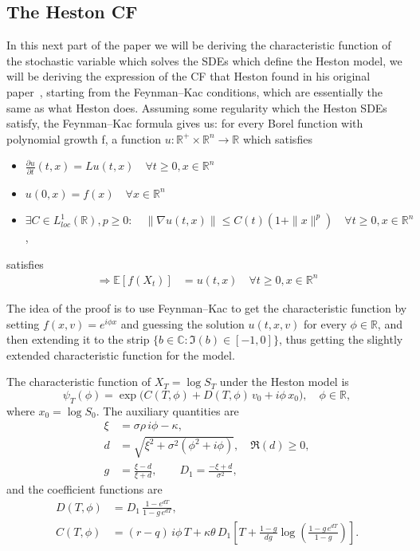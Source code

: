 \subsection{The Heston CF}
In this next part of the paper we will be deriving the characteristic function of the stochastic variable which solves the SDEs
which define the Heston model, we will be deriving the expression of the CF that Heston found in his original paper~\cite{heston1993},
starting from the Feynman--Kac conditions, which are essentially the same as what Heston does.
Assuming some regularity which the Heston SDEs satisfy, the Feynman--Kac formula gives us:
for every Borel function with polynomial growth f, a function $u:\mathbb{R}^+\times\mathbb{R}^n\rightarrow \mathbb{R}$ which satisfies
\begin{itemize}
\item[i)] $\frac{\partial u}{\partial t}(t, x) = Lu(t, x)\quad \forall t\geq0,x\in \mathbb{R}^n$\\
\item[ii)] $u(0, x) = f(x)\quad \forall x\in \mathbb{R}^n$\\
\item[iii)] $\exists C\in L^1_{loc}(\mathbb{R}),p\geq 0:\quad  \|\nabla u(t, x)\| \leq C(t)\left(1 + \|x\|^p\right)\quad \forall t\geq 0, x\in \mathbb{R}^n$,
\end{itemize}

satisfies
\begin{align}
\Rightarrow \mathbb{E}[f(X_t)] &=u(t,x)\quad\forall t\geq0,x\in \mathbb{R}^n
\end{align}

The idea of the proof is to use Feynman--Kac to get the characteristic function by setting $f(x,v)=e^{i\phi x}$ and guessing the solution
$u(t,x,v)$ for every $\phi\in\mathbb{R}$, and then extending it to the strip $\{b\in\mathbb{C}:\Im(b)\in[-1,0]\}$, thus getting the slightly extended characteristic function for the model.

\begin{theorem}
The characteristic function of $X_T = \log S_T$ under the Heston model is
\begin{equation}
\psi_T(\phi) = \exp\!\bigl(C(T,\phi) + D(T,\phi)\,v_0 + i\phi\,x_0\bigr), \quad \phi\in\mathbb{R},
\end{equation}
where $x_0 = \log S_0$. The auxiliary quantities are
\begin{align}
\xi &= \sigma\rho\,i\phi - \kappa, \\
d &= \sqrt{\xi^2 + \sigma^2(\phi^2+i\phi)}, \quad \Re(d)\geq 0,\\
g &= \frac{\xi-d}{\xi+d},\qquad D_1 = \frac{-\xi+d}{\sigma^2},
\end{align}
and the coefficient functions are
\begin{align}
D(T,\phi) &= D_1\,\frac{1-e^{dT}}{1-g\,e^{dT}}, \\[6pt]
C(T,\phi) &= (r-q)\,i\phi\,T
  + \kappa\theta\,D_1\!\left[T + \frac{1-g}{dg}
    \log\!\!\left(\frac{1-g\,e^{dT}}{1-g}\right)\right].
\end{align}
\end{theorem}

